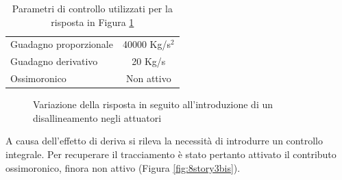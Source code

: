 \begin{table}
\centering
\footnotesize
\begin{tabular}{lc}
\toprule
Guadagno proporzionale & 40000 Kg/s$^2$\\
Guadagno derivativo & 20 Kg/s\\
Ossimoronico & Non attivo\\
\bottomrule
\end{tabular}
\label{tab:8story3}
\caption{Parametri di controllo utilizzati per la risposta in Figura \ref{fig:8story3}}
\end{table}
\begin{figure}[h]
\footnotesize
\centering
{}
\caption{Variazione della risposta in seguito all'introduzione di un disallineamento negli attuatori}
\label{fig:8story3}
\end{figure}

A causa dell'effetto di deriva si rileva la necessità di introdurre un controllo integrale. Per recuperare il tracciamento è stato pertanto attivato il contributo ossimoronico, finora non attivo (Figura \ref{fig:8story3bis}). 

